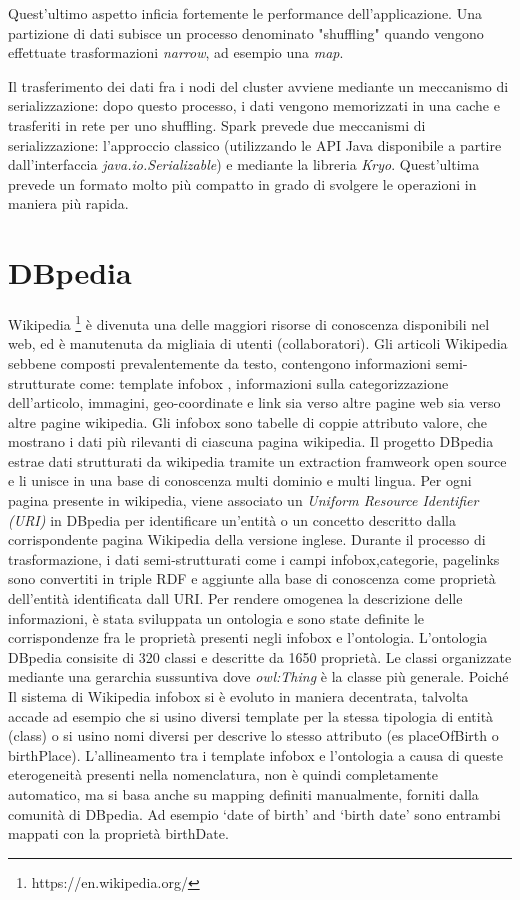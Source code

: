 Quest'ultimo aspetto inficia fortemente le performance dell'applicazione. Una partizione di dati subisce un processo denominato "shuffling"  quando vengono effettuate trasformazioni \textit{narrow}, ad esempio una \textit{map}.

Il trasferimento dei dati fra i nodi del cluster avviene mediante un meccanismo di serializzazione: dopo questo processo, i dati vengono memorizzati in una cache e trasferiti in rete per uno shuffling. Spark prevede due meccanismi di serializzazione: l'approccio classico (utilizzando le API Java disponibile a partire dall'interfaccia \textit{java.io.Serializable}) e mediante la libreria \textit{Kryo}. Quest'ultima prevede un formato molto più compatto in grado di svolgere le operazioni in maniera più rapida.


\section{DBpedia}
Wikipedia \footnote{https://en.wikipedia.org/} è divenuta una delle maggiori risorse di conoscenza disponibili nel web, ed è manutenuta da migliaia di utenti (collaboratori). Gli articoli Wikipedia sebbene composti prevalentemente da testo, contengono informazioni semi-strutturate come: template infobox , informazioni sulla categorizzazione dell'articolo, immagini, geo-coordinate e link sia verso altre pagine web sia verso altre pagine wikipedia.
Gli infobox sono tabelle di coppie attributo valore, che mostrano i dati più rilevanti di ciascuna pagina wikipedia. Il progetto DBpedia \cite{Bizer:2009:DCP:1640541.1640848} estrae dati strutturati da wikipedia tramite un extraction framweork open source e li unisce in una base di conoscenza multi dominio e multi lingua. Per ogni pagina presente in wikipedia, viene associato un \emph{Uniform Resource Identifier (URI)} in DBpedia per identificare un'entità o un concetto descritto dalla corrispondente pagina Wikipedia della versione inglese. Durante il processo di trasformazione, i dati semi-strutturati come i campi infobox,categorie, pagelinks sono convertiti in triple RDF e aggiunte alla base di conoscenza come proprietà dell'entità identificata dall URI.  Per rendere omogenea la descrizione delle informazioni, è stata sviluppata un ontologia e sono state definite le corrispondenze fra le proprietà presenti negli infobox e l'ontologia.
L'ontologia DBpedia consisite di 320 classi e descritte da 1650 proprietà. Le classi organizzate mediante una gerarchia sussuntiva dove \emph{owl:Thing} è la classe più generale. Poiché Il sistema di Wikipedia infobox si è evoluto in maniera decentrata, talvolta accade ad esempio che si usino diversi template per la stessa tipologia di entità (class) o si usino nomi diversi per descrive lo stesso attributo (es placeOfBirth o birthPlace). 
 L'allineamento tra i template infobox e l'ontologia a causa di queste eterogeneità presenti nella nomenclatura, non è quindi completamente automatico, ma si basa anche su mapping definiti manualmente, forniti dalla comunità di DBpedia. Ad esempio ‘date of birth’ and ‘birth
date’ sono entrambi mappati con la proprietà birthDate. 
 
